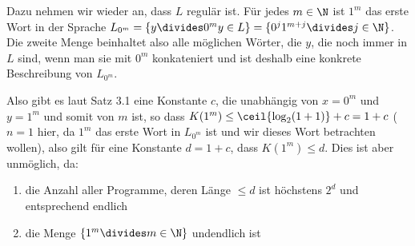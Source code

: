 Dazu nehmen wir wieder an, dass $L$ regulär ist. Für jedes $m \in \N$ ist $1^m$ das erste Wort in der Sprache $L_{0^m} = \{ y \divides 0^m y \in L \} = \{ 0^j 1^{m + j} \divides j \in \N \}$.
Die zweite Menge beinhaltet also alle möglichen Wörter, die $y$, die noch immer in $L$ sind, wenn man sie mit $0^m$ konkateniert
und ist deshalb eine konkrete Beschreibung von $L_{0^m}$.

Also gibt es laut Satz 3.1 eine Konstante $c$, die unabhängig von $x = 0^m$ und $y = 1^m$ und somit von $m$ ist, so dass $K(1^m) \leq \ceil{\log_2(1 + 1)} + c = 1 + c$
($n = 1$ hier, da $1^m$ das erste Wort in $L_{0^m}$ ist und wir dieses Wort betrachten wollen),
also gilt für eine Konstante $d = 1 + c$, dass $K(1^m) \leq d$.
Dies ist aber unmöglich, da:
\begin{enumerate}[label=(\roman*)]
    \item die Anzahl aller Programme, deren Länge $\leq d$ ist höchstens $2^d$ und entsprechend endlich
    \item die Menge $\{ 1^m \divides m \in \N \}$ undendlich ist
\end{enumerate}

\numberingOn
